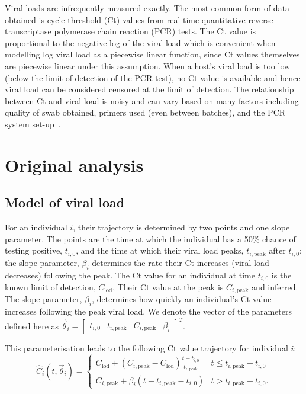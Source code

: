\documentclass[thesis.tex]{subfiles}
\begin{document}
Viral loads are infrequently measured exactly.
The most common form of data obtained is cycle threshold (Ct) values from real-time quantitative  reverse-transcriptase polymerase chain reaction (PCR) tests.
The Ct value is proportional to the negative log of the viral load which is convenient when modelling log viral load as a piecewise linear function, since Ct values themselves are piecewise linear under this assumption.
When a host's viral load is too low (below the limit of detection of the PCR test), no Ct value is available and hence viral load can be considered censored at the limit of detection.
The relationship between Ct and viral load is noisy and can vary based on many factors including quality of swab obtained, primers used (even between batches), and the PCR system set-up~\autocites{dahdouhCt,hanRTPCR}.

\section{Original analysis}


\subsection{Model of viral load}

For an individual $i$, their trajectory is determined by two points and one slope parameter.
The points are the time at which the individual has a 50\% chance of testing positive, $t_{i,0}$, and the time at which their viral load
peaks, $t_{i,\text{peak}}$ after $t_{i,0}$; the slope parameter, $\beta_i$ determines the rate their Ct increases (viral load decreases) following the peak.
The Ct value for an individual at time $t_{i,0}$ is the known limit of detection, $C_\text{lod}$,
Their Ct value at the peak is $C_{i,\text{peak}}$ and inferred.
The slope parameter, $\beta_i$, determines how quickly an individual's Ct value increases following the peak viral load.
We denote the vector of the parameters defined here as $\vec\theta_i = \begin{bmatrix} t_{i,0} & t_{i,\text{peak}} & C_{i,\text{peak}} &  \beta_i \end{bmatrix}^T$.

This parameterisation leads to the following Ct value trajectory for individual $i$:
$$
\hat{C}_i(t, \vec\theta_i) = \begin{cases}
  C_{\text{lod}} + (C_{i,\text{peak}} - C_{\text{lod}}) \frac{t - t_{i,0}}{t_{i,\text{peak}}}
    &t \leq t_{i,\text{peak}} + t_{i,0} \\
  C_{i,\text{peak}} + \beta_i (t - t_{i,\text{peak}} - t_{i,0})
    &t > t_{i,\text{peak}} + t_{i,0}.
\end{cases}
$$
\end{document}
